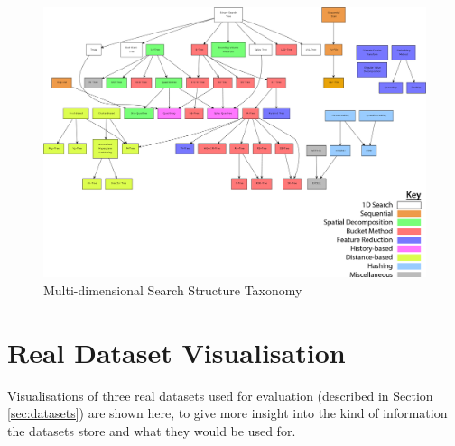 \begin{landscape}
	\null  %
	\nointerlineskip  %
	\vfill
	\let\snewpage \newpage
	\let\newpage \relax
		\begin{figure}[H]
			\centering
			\includegraphics[scale=0.35]{figures/md_structure_taxonomy.png}
			\caption{Multi-dimensional Search Structure Taxonomy}
			\label{fig:structure-taxonomy}
		\end{figure}
	\let \newpage \snewpage
	\vfill 
	\break %

	\newpage

\end{landscape}

\section{Real Dataset Visualisation}
\label{sec:app-real-datasets}

Visualisations of three real datasets used for evaluation (described in Section \ref{sec:datasets}) are shown here, to give more insight into the kind of information the datasets store and what they would be used for.

\paragraph{}

